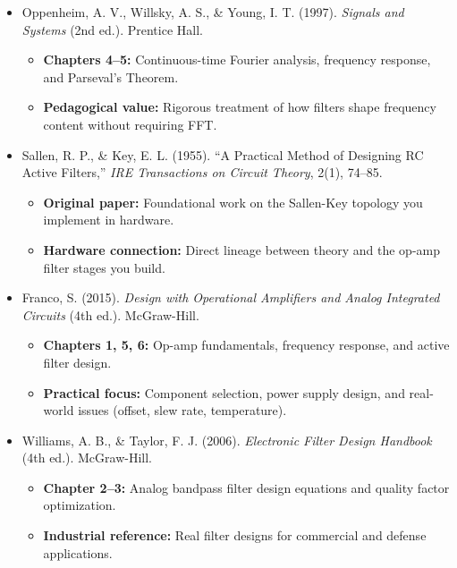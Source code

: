 \documentclass[11pt,letterpaper]{article}
\begin{document}
\begin{itemize}
    \item Oppenheim, A. V., Willsky, A. S., \& Young, I. T. (1997). \textit{Signals and Systems} (2nd ed.). Prentice Hall.
    \begin{itemize}
        \item \textbf{Chapters 4--5:} Continuous-time Fourier analysis, frequency response, and Parseval's Theorem.
        \item \textbf{Pedagogical value:} Rigorous treatment of how filters shape frequency content without requiring FFT.
    \end{itemize}

    \item Sallen, R. P., \& Key, E. L. (1955). ``A Practical Method of Designing RC Active Filters,'' \textit{IRE Transactions on Circuit Theory}, 2(1), 74--85.
    \begin{itemize}
        \item \textbf{Original paper:} Foundational work on the Sallen-Key topology you implement in hardware.
        \item \textbf{Hardware connection:} Direct lineage between theory and the op-amp filter stages you build.
    \end{itemize}

    \item Franco, S. (2015). \textit{Design with Operational Amplifiers and Analog Integrated Circuits} (4th ed.). McGraw-Hill.
    \begin{itemize}
        \item \textbf{Chapters 1, 5, 6:} Op-amp fundamentals, frequency response, and active filter design.
        \item \textbf{Practical focus:} Component selection, power supply design, and real-world issues (offset, slew rate, temperature).
    \end{itemize}

    \item Williams, A. B., \& Taylor, F. J. (2006). \textit{Electronic Filter Design Handbook} (4th ed.). McGraw-Hill.
    \begin{itemize}
        \item \textbf{Chapter 2--3:} Analog bandpass filter design equations and quality factor optimization.
        \item \textbf{Industrial reference:} Real filter designs for commercial and defense applications.
    \end{itemize}


\end{itemize}
\end{document}

